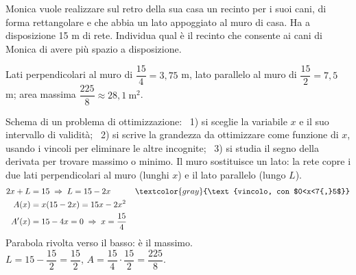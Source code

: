 \begin{question}[ID=1.3, subtitle={Recinto rettangolare di massima area con un lato al muro}, tags={ottimizzazione, geometria}, difficulty=facile]
Monica vuole realizzare sul retro della sua casa un recinto per i suoi cani, di forma rettangolare e che abbia un lato appoggiato al muro di casa. Ha a disposizione 15 m di rete. Individua qual è il recinto che consente ai cani di Monica di avere più spazio a disposizione.
\begin{solution}
Lati perpendicolari al muro di $\dfrac{15}{4}=3{,}75$ m, lato parallelo al muro di $\dfrac{15}{2}=7{,}5$ m; area massima $\dfrac{225}{8}\approx28{,}1\ \text{m}^2$.
\end{solution}
\begin{explanation}
Schema di un problema di ottimizzazione: \ 1) si sceglie la variabile $x$ e il suo intervallo di validità; \ 2) si scrive la grandezza da ottimizzare come funzione di $x$, usando i vincoli per eliminare le altre incognite; \ 3) si studia il segno della derivata per trovare massimo o minimo.
Il muro sostituisce un lato: la rete copre i due lati perpendicolari al muro (lunghi $x$) e il lato parallelo (lungo $L$).
\[\begin{aligned}
2x+L &= 15 \;\Rightarrow\; L=15-2x && \textcolor{gray}{\text{vincolo, con $0<x<7{,}5$}}\\
A(x) &= x(15-2x)=15x-2x^2\\
A'(x) &= 15-4x=0 \;\Rightarrow\; x=\dfrac{15}{4}
\end{aligned}\]
Parabola rivolta verso il basso: è il massimo. \\
$L=15-\dfrac{15}{2}=\dfrac{15}{2}$, \quad $A=\dfrac{15}{4}\cdot\dfrac{15}{2}=\dfrac{225}{8}$.
\end{explanation}
\end{question}


